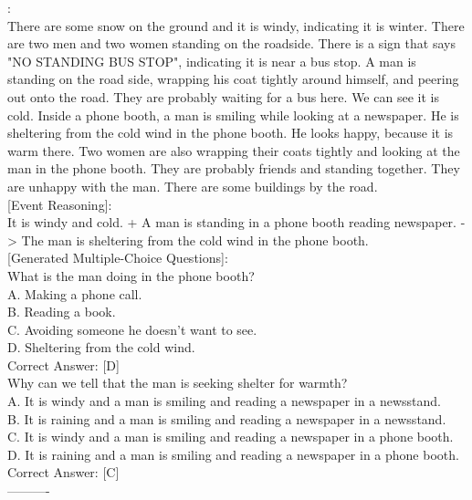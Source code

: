 \begin{figure*}[h]
\begin{tcolorbox}
    [Description]:  \\
    There are some snow on the ground and it is windy, indicating it is winter. There are two men and two women standing on the roadside. There is a sign that says "NO STANDING BUS STOP", indicating it is near a bus stop. A man is standing on the road side, wrapping his coat tightly around himself, and peering out onto the road. They are probably waiting for a bus here. We can see it is cold. Inside a phone booth, a man is smiling while looking at a newspaper. He is sheltering from the cold wind in the phone booth. He looks happy, because it is warm there. Two women are also wrapping their coats tightly and looking at the man in the phone booth. They are probably friends and standing together. They are unhappy with the man. There are some buildings by the road. \\

    [Event Reasoning]:  \\ 
    It is windy and cold. + A man is standing in a phone booth reading newspaper. -> The man is sheltering from the cold wind in the phone booth. \\

    [Generated Multiple-Choice Questions]:  \\
    What is the man doing in the phone booth? \\
    A. Making a phone call. \\
    B. Reading a book. \\
    C. Avoiding someone he doesn't want to see. \\
    D. Sheltering from the cold wind. \\
    Correct Answer: [D] \\

    Why can we tell that the man is seeking shelter for warmth? \\
    A. It is windy and a man is smiling and reading a newspaper in a newsstand. \\
    B. It is raining and a man is smiling and reading a newspaper in a newsstand. \\
    C. It is windy and a man is smiling and reading a newspaper in a phone booth. \\
    D. It is raining and a man is smiling and reading a newspaper in a phone booth. \\
    Correct Answer: [C] \\
    ---------- \\


\end{tcolorbox}
\end{figure*}
